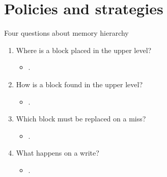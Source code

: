 \section{Policies and strategies}

\begin{frame}[t]{Four questions about memory hierarchy}
\begin{enumerate}
  \item Where is a block placed in the upper level?
    \begin{itemize}
      \item {}.
    \end{itemize}

  \item How is a block found in the upper level?
    \begin{itemize}
      \item {}.
    \end{itemize}

  \item Which block must be replaced on a miss?
    \begin{itemize}
      \item {}.
    \end{itemize}


  \item What happens on a write?
    \begin{itemize}
      \item {}.
    \end{itemize}

\end{enumerate}
\end{frame}

